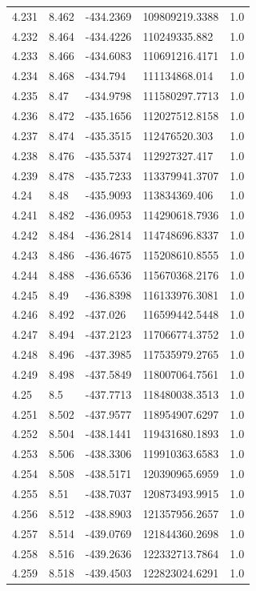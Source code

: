 \begin{tabular}{lllll}
4.231 & 8.462 & -434.2369 & 109809219.3388 & 1.0 \\
4.232 & 8.464 & -434.4226 & 110249335.882 & 1.0 \\
4.233 & 8.466 & -434.6083 & 110691216.4171 & 1.0 \\
4.234 & 8.468 & -434.794 & 111134868.014 & 1.0 \\
4.235 & 8.47 & -434.9798 & 111580297.7713 & 1.0 \\
4.236 & 8.472 & -435.1656 & 112027512.8158 & 1.0 \\
4.237 & 8.474 & -435.3515 & 112476520.303 & 1.0 \\
4.238 & 8.476 & -435.5374 & 112927327.417 & 1.0 \\
4.239 & 8.478 & -435.7233 & 113379941.3707 & 1.0 \\
4.24 & 8.48 & -435.9093 & 113834369.406 & 1.0 \\
4.241 & 8.482 & -436.0953 & 114290618.7936 & 1.0 \\
4.242 & 8.484 & -436.2814 & 114748696.8337 & 1.0 \\
4.243 & 8.486 & -436.4675 & 115208610.8555 & 1.0 \\
4.244 & 8.488 & -436.6536 & 115670368.2176 & 1.0 \\
4.245 & 8.49 & -436.8398 & 116133976.3081 & 1.0 \\
4.246 & 8.492 & -437.026 & 116599442.5448 & 1.0 \\
4.247 & 8.494 & -437.2123 & 117066774.3752 & 1.0 \\
4.248 & 8.496 & -437.3985 & 117535979.2765 & 1.0 \\
4.249 & 8.498 & -437.5849 & 118007064.7561 & 1.0 \\
4.25 & 8.5 & -437.7713 & 118480038.3513 & 1.0 \\
4.251 & 8.502 & -437.9577 & 118954907.6297 & 1.0 \\
4.252 & 8.504 & -438.1441 & 119431680.1893 & 1.0 \\
4.253 & 8.506 & -438.3306 & 119910363.6583 & 1.0 \\
4.254 & 8.508 & -438.5171 & 120390965.6959 & 1.0 \\
4.255 & 8.51 & -438.7037 & 120873493.9915 & 1.0 \\
4.256 & 8.512 & -438.8903 & 121357956.2657 & 1.0 \\
4.257 & 8.514 & -439.0769 & 121844360.2698 & 1.0 \\
4.258 & 8.516 & -439.2636 & 122332713.7864 & 1.0 \\
4.259 & 8.518 & -439.4503 & 122823024.6291 & 1.0 \\

\end{tabular}
